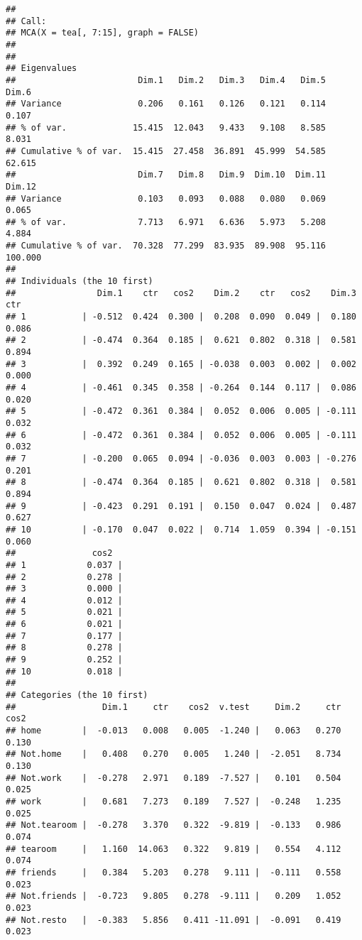 \documentclass[]{article}
\begin{document}
\begin{verbatim}
## 
## Call:
## MCA(X = tea[, 7:15], graph = FALSE) 
## 
## 
## Eigenvalues
##                        Dim.1   Dim.2   Dim.3   Dim.4   Dim.5   Dim.6
## Variance               0.206   0.161   0.126   0.121   0.114   0.107
## % of var.             15.415  12.043   9.433   9.108   8.585   8.031
## Cumulative % of var.  15.415  27.458  36.891  45.999  54.585  62.615
##                        Dim.7   Dim.8   Dim.9  Dim.10  Dim.11  Dim.12
## Variance               0.103   0.093   0.088   0.080   0.069   0.065
## % of var.              7.713   6.971   6.636   5.973   5.208   4.884
## Cumulative % of var.  70.328  77.299  83.935  89.908  95.116 100.000
## 
## Individuals (the 10 first)
##                Dim.1    ctr   cos2    Dim.2    ctr   cos2    Dim.3    ctr
## 1           | -0.512  0.424  0.300 |  0.208  0.090  0.049 |  0.180  0.086
## 2           | -0.474  0.364  0.185 |  0.621  0.802  0.318 |  0.581  0.894
## 3           |  0.392  0.249  0.165 | -0.038  0.003  0.002 |  0.002  0.000
## 4           | -0.461  0.345  0.358 | -0.264  0.144  0.117 |  0.086  0.020
## 5           | -0.472  0.361  0.384 |  0.052  0.006  0.005 | -0.111  0.032
## 6           | -0.472  0.361  0.384 |  0.052  0.006  0.005 | -0.111  0.032
## 7           | -0.200  0.065  0.094 | -0.036  0.003  0.003 | -0.276  0.201
## 8           | -0.474  0.364  0.185 |  0.621  0.802  0.318 |  0.581  0.894
## 9           | -0.423  0.291  0.191 |  0.150  0.047  0.024 |  0.487  0.627
## 10          | -0.170  0.047  0.022 |  0.714  1.059  0.394 | -0.151  0.060
##               cos2  
## 1            0.037 |
## 2            0.278 |
## 3            0.000 |
## 4            0.012 |
## 5            0.021 |
## 6            0.021 |
## 7            0.177 |
## 8            0.278 |
## 9            0.252 |
## 10           0.018 |
## 
## Categories (the 10 first)
##                 Dim.1     ctr    cos2  v.test     Dim.2     ctr    cos2
## home        |  -0.013   0.008   0.005  -1.240 |   0.063   0.270   0.130
## Not.home    |   0.408   0.270   0.005   1.240 |  -2.051   8.734   0.130
## Not.work    |  -0.278   2.971   0.189  -7.527 |   0.101   0.504   0.025
## work        |   0.681   7.273   0.189   7.527 |  -0.248   1.235   0.025
## Not.tearoom |  -0.278   3.370   0.322  -9.819 |  -0.133   0.986   0.074
## tearoom     |   1.160  14.063   0.322   9.819 |   0.554   4.112   0.074
## friends     |   0.384   5.203   0.278   9.111 |  -0.111   0.558   0.023
## Not.friends |  -0.723   9.805   0.278  -9.111 |   0.209   1.052   0.023
## Not.resto   |  -0.383   5.856   0.411 -11.091 |  -0.091   0.419   0.023

\end{verbatim}
\end{document}
